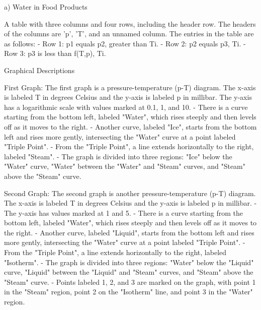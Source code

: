 a) Water in Food Products

A table with three columns and four rows, including the header row. The headers of the columns are 'p', 'T', and an unnamed column. The entries in the table are as follows:
- Row 1: p1 equals p2, greater than Ti.
- Row 2: p2 equals p3, Ti.
- Row 3: p3 is less than f(T,p), Ti.

Graphical Descriptions

First Graph:
The first graph is a pressure-temperature (p-T) diagram. The x-axis is labeled T in degrees Celsius and the y-axis is labeled p in millibar. The y-axis has a logarithmic scale with values marked at 0.1, 1, and 10.
- There is a curve starting from the bottom left, labeled "Water", which rises steeply and then levels off as it moves to the right.
- Another curve, labeled "Ice", starts from the bottom left and rises more gently, intersecting the "Water" curve at a point labeled "Triple Point".
- From the "Triple Point", a line extends horizontally to the right, labeled "Steam".
- The graph is divided into three regions: "Ice" below the "Water" curve, "Water" between the "Water" and "Steam" curves, and "Steam" above the "Steam" curve.

Second Graph:
The second graph is another pressure-temperature (p-T) diagram. The x-axis is labeled T in degrees Celsius and the y-axis is labeled p in millibar.
- The y-axis has values marked at 1 and 5.
- There is a curve starting from the bottom left, labeled "Water", which rises steeply and then levels off as it moves to the right.
- Another curve, labeled "Liquid", starts from the bottom left and rises more gently, intersecting the "Water" curve at a point labeled "Triple Point".
- From the "Triple Point", a line extends horizontally to the right, labeled "Isotherm".
- The graph is divided into three regions: "Water" below the "Liquid" curve, "Liquid" between the "Liquid" and "Steam" curves, and "Steam" above the "Steam" curve.
- Points labeled 1, 2, and 3 are marked on the graph, with point 1 in the "Steam" region, point 2 on the "Isotherm" line, and point 3 in the "Water" region.